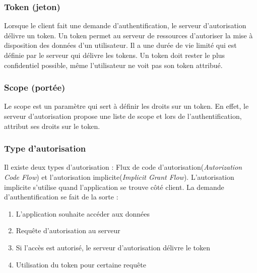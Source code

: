 \documentclass[11pt]{report} %
\begin{document}
			\subsubsection{Token (jeton)}
			\label{token}
			Lorsque le client fait une demande d'authentification, le serveur d'autorisation délivre un token. Un token permet au serveur de ressources d'autoriser la mise à disposition des données d'un utilisateur. Il a une durée de vie limité qui est définie par le serveur qui délivre les tokens.
			Un token doit rester le plus confidentiel possible, même l'utilisateur ne voit pas son token attribué.
			
			\subsubsection{Scope (portée)}
			Le scope est un paramètre qui sert à définir les droits sur un token. En effet, le serveur d'autorisation propose une liste de scope et lors de l'authentification, attribut ses droits sur le token.
			
			\subsubsection{Type d'autorisation}
			Il existe deux types d'autorisation : Flux de code d'autorisation(\textit{Autorization Code Flow}) et l'autorisation implicite(\textit{Implicit Grant Flow}). L'autorisation implicite s'utilise quand l'application se trouve côté client. La demande d'authentification se fait de la sorte :
			\begin{enumerate}
				\item L'application souhaite accéder aux données
				\item Requête d'autorisation au serveur
				\item Si l'accès est autorisé, le serveur d'autorisation délivre le token
				\item Utilisation du token pour certaine requête 
			\end{enumerate}
			
			\newpage
			
\end{document}
